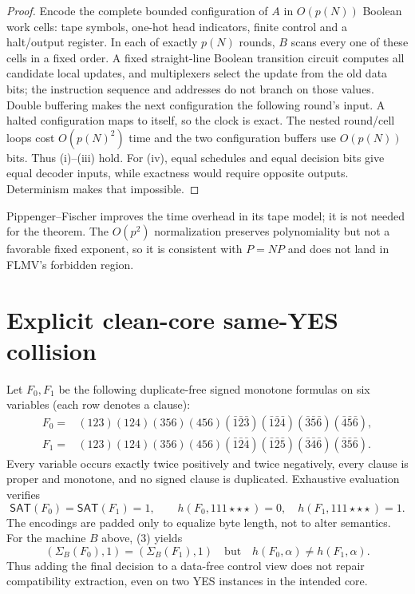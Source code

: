 \documentclass[11pt]{article}
\begin{document}
\begin{proof}
Encode the complete bounded configuration of $A$ in $O(p(N))$ Boolean work
cells: tape symbols, one-hot head indicators, finite control and a halt/output
register.  In each of exactly $p(N)$ rounds, $B$ scans every one of these
cells in a fixed order.  A fixed straight-line Boolean transition circuit
computes all candidate local updates, and multiplexers select the update from
the old data bits; the instruction sequence and addresses do not branch on
those values.  Double buffering makes the next configuration the following
round's input.  A halted configuration maps to itself, so the clock is exact.
The nested round/cell loops cost $O(p(N)^2)$ time and the two configuration
buffers use $O(p(N))$ bits.  Thus (i)--(iii) hold.  For (iv), equal schedules
and equal decision bits give equal decoder inputs, while exactness would
require opposite outputs.  Determinism makes that impossible.
\end{proof}

Pippenger--Fischer improves the time overhead in its tape model; it is not
needed for the theorem.  The $O(p^2)$ normalization preserves polynomiality
but not a favorable fixed exponent, so it is consistent with $P=NP$ and does
not land in FLMV's forbidden region.

\section{Explicit clean-core same-YES collision}
Let $F_0,F_1$ be the following duplicate-free signed monotone formulas on six
variables (each row denotes a clause):
\begin{align*}
F_0={}&(123)(124)(356)(456)
       (\bar1\bar2\bar3)(\bar1\bar2\bar4)
       (\bar3\bar5\bar6)(\bar4\bar5\bar6),\\
F_1={}&(123)(124)(356)(456)
       (\bar1\bar2\bar4)(\bar1\bar2\bar5)
       (\bar3\bar4\bar6)(\bar3\bar5\bar6).
\end{align*}
Every variable occurs exactly twice positively and twice negatively, every
clause is proper and monotone, and no signed clause is duplicated.  Exhaustive
evaluation verifies
\[
 \mathsf{SAT}(F_0)=\mathsf{SAT}(F_1)=1,
 \qquad
 h(F_0,111\star\star\star)=0,
 \quad h(F_1,111\star\star\star)=1.                     \tag{3}
\]
The encodings are padded only to equalize byte length, not to alter semantics.
For the machine $B$ above, (3) yields
\[
 (\Sigma_B(F_0),1)=(\Sigma_B(F_1),1)
 \quad\text{but}\quad h(F_0,\alpha)\ne h(F_1,\alpha).  \tag{4}
\]
Thus adding the final decision to a data-free control view does not repair
compatibility extraction, even on two YES instances in the intended core.
\end{document}
